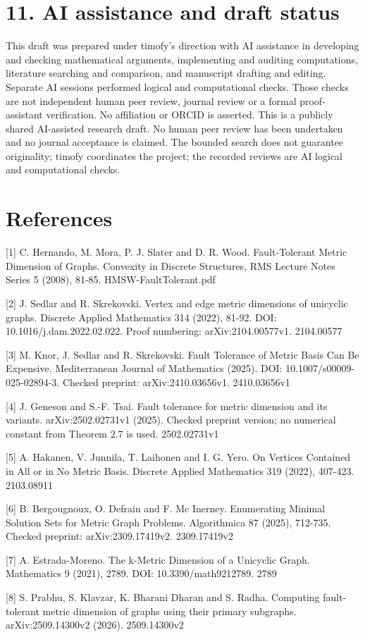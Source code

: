 \documentclass[
]{article}
\begin{document}
\section{11. AI assistance and draft
status}\label{ai-assistance-and-draft-status}

This draft was prepared under timofy's direction with AI assistance in
developing and checking mathematical arguments, implementing and
auditing computations, literature searching and comparison, and
manuscript drafting and editing. Separate AI sessions performed logical
and computational checks. Those checks are not independent human peer
review, journal review or a formal proof-assistant verification. No
affiliation or ORCID is asserted. This is a publicly shared AI-assisted
research draft. No human peer review has been undertaken and no journal
acceptance is claimed. The bounded search does not guarantee
originality; timofy coordinates the project; the recorded reviews are AI
logical and computational checks.

\section{References}\label{references}

{[}1{]} C. Hernando, M. Mora, P. J. Slater and D. R. Wood.
Fault-Tolerant Metric Dimension of Graphs. Convexity in Discrete
Structures, RMS Lecture Notes Series 5 (2008), 81-85.
HMSW-FaultTolerant.pdf

{[}2{]} J. Sedlar and R. Skrekovski. Vertex and edge metric dimensions
of unicyclic graphs. Discrete Applied Mathematics 314 (2022), 81-92.
DOI: 10.1016/j.dam.2022.02.022. Proof numbering: arXiv:2104.00577v1.
2104.00577

{[}3{]} M. Knor, J. Sedlar and R. Skrekovski. Fault Tolerance of Metric
Basis Can Be Expensive. Mediterranean Journal of Mathematics (2025).
DOI: 10.1007/s00009-025-02894-3. Checked preprint: arXiv:2410.03656v1.
2410.03656v1

{[}4{]} J. Geneson and S.-F. Tsai. Fault tolerance for metric dimension
and its variants. arXiv:2502.02731v1 (2025). Checked preprint version;
no numerical constant from Theorem 2.7 is used. 2502.02731v1

{[}5{]} A. Hakanen, V. Junnila, T. Laihonen and I. G. Yero. On Vertices
Contained in All or in No Metric Basis. Discrete Applied Mathematics 319
(2022), 407-423. 2103.08911

{[}6{]} B. Bergougnoux, O. Defrain and F. Mc Inerney. Enumerating
Minimal Solution Sets for Metric Graph Problems. Algorithmica 87 (2025),
712-735. Checked preprint: arXiv:2309.17419v2. 2309.17419v2

{[}7{]} A. Estrada-Moreno. The k-Metric Dimension of a Unicyclic Graph.
Mathematics 9 (2021), 2789. DOI: 10.3390/math9212789. 2789

{[}8{]} S. Prabhu, S. Klavzar, K. Bharani Dharan and S. Radha. Computing
fault-tolerant metric dimension of graphs using their primary subgraphs.
arXiv:2509.14300v2 (2026). 2509.14300v2
\end{document}
